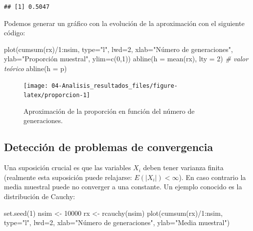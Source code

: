 \documentclass[
]{book}
\newenvironment{Shaded}{\begin{snugshade}}{\end{snugshade}}
\newcommand{\AttributeTok}[1]{\textcolor[rgb]{0.77,0.63,0.00}{#1}}
\newcommand{\CommentTok}[1]{\textcolor[rgb]{0.56,0.35,0.01}{\textit{#1}}}
\newcommand{\DecValTok}[1]{\textcolor[rgb]{0.00,0.00,0.81}{#1}}
\newcommand{\FunctionTok}[1]{\textcolor[rgb]{0.00,0.00,0.00}{#1}}
\newcommand{\NormalTok}[1]{#1}
\newcommand{\OtherTok}[1]{\textcolor[rgb]{0.56,0.35,0.01}{#1}}
\newcommand{\SpecialCharTok}[1]{\textcolor[rgb]{0.00,0.00,0.00}{#1}}
\newcommand{\StringTok}[1]{\textcolor[rgb]{0.31,0.60,0.02}{#1}}
\theoremstyle{break}
\theoremstyle{definition}
\theoremstyle{definition}
\theoremstyle{definition}
\theoremstyle{definition}
\theoremstyle{remark}
\begin{document}
\begin{verbatim}
## [1] 0.5047
\end{verbatim}

Podemos generar un gráfico con la evolución de la aproximación con el siguiente código:

\begin{Shaded}
\begin{Highlighting}[]
\FunctionTok{plot}\NormalTok{(}\FunctionTok{cumsum}\NormalTok{(rx)}\SpecialCharTok{/}\DecValTok{1}\SpecialCharTok{:}\NormalTok{nsim, }\AttributeTok{type=}\StringTok{"l"}\NormalTok{, }\AttributeTok{lwd=}\DecValTok{2}\NormalTok{, }\AttributeTok{xlab=}\StringTok{"Número de generaciones"}\NormalTok{, }
     \AttributeTok{ylab=}\StringTok{"Proporción muestral"}\NormalTok{, }\AttributeTok{ylim=}\FunctionTok{c}\NormalTok{(}\DecValTok{0}\NormalTok{,}\DecValTok{1}\NormalTok{))}
\FunctionTok{abline}\NormalTok{(}\AttributeTok{h =} \FunctionTok{mean}\NormalTok{(rx), }\AttributeTok{lty =} \DecValTok{2}\NormalTok{)}
\CommentTok{\# valor teórico}
\FunctionTok{abline}\NormalTok{(}\AttributeTok{h =}\NormalTok{ p) }
\end{Highlighting}
\end{Shaded}

\begin{figure}[!htb]

{\centering \texttt{[image: 04-Analisis\_resultados\_files/figure-latex/proporcion-1]} 

}

\caption{Aproximación de la proporción en función del número de generaciones.}\label{fig:proporcion}
\end{figure}

\hypertarget{detecciuxf3n-de-problemas-de-convergencia}{%
\subsection{Detección de problemas de convergencia}\label{detecciuxf3n-de-problemas-de-convergencia}}

Una suposición crucial es que las variables \(X_{i}\) deben tener
varianza finita (realmente esta suposición puede relajarse:
\(E\left( \left\vert X_{i} \right\vert \right) < \infty\)).
En caso contrario la media muestral puede no converger a
una constante. Un ejemplo conocido es la distribución de Cauchy:

\begin{Shaded}
\begin{Highlighting}[]
\FunctionTok{set.seed}\NormalTok{(}\DecValTok{1}\NormalTok{)}
\NormalTok{nsim }\OtherTok{\textless{}{-}} \DecValTok{10000}
\NormalTok{rx }\OtherTok{\textless{}{-}} \FunctionTok{rcauchy}\NormalTok{(nsim)}
\FunctionTok{plot}\NormalTok{(}\FunctionTok{cumsum}\NormalTok{(rx)}\SpecialCharTok{/}\DecValTok{1}\SpecialCharTok{:}\NormalTok{nsim, }\AttributeTok{type=}\StringTok{"l"}\NormalTok{, }\AttributeTok{lwd=}\DecValTok{2}\NormalTok{, }
     \AttributeTok{xlab=}\StringTok{"Número de generaciones"}\NormalTok{, }\AttributeTok{ylab=}\StringTok{"Media muestral"}\NormalTok{)}
\end{Highlighting}
\end{Shaded}
\end{document}
